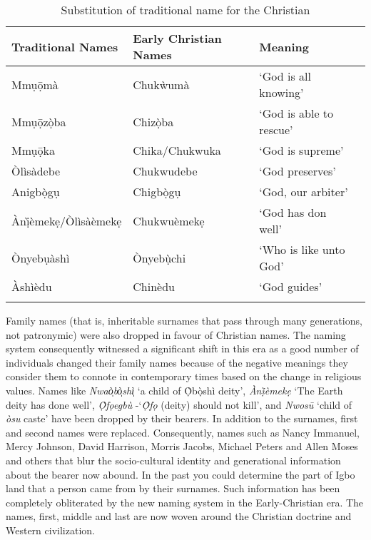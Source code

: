 \documentclass[output=paper]{langscibook}
\begin{document}
\begin{table}
\caption{\label{tab:owaleke:4.1}Substitution of traditional name for the Christian}
\begin{tabular}{llll}
\lsptoprule
{Traditional Names}             & {Early Christian Names} & {Meaning}                 &  \\ 
\midrule
{Mmụọ̄mà}                    & {Chukẁumà}            & {‘God is all knowing’}    &  \\ 
{Mmụọ̄zọ̀ba}                 & {Chizọ̀ba}             & {‘God is able to rescue’} &  \\ 
{Mmụọ̄ka}                     & {Chika/Chukwuka}        & {‘God is supreme’}        &  \\ 
{Òlìsàdebe}                  & {Chukwudebe}            & {‘God preserves’}         &  \\ 
{Anigbọ̀gụ}                   & {Chigbọ̀gụ}           & {‘God, our arbiter'}      &  \\ 
{Ànị̀èmekẹ/Òlìsàèmekẹ} & {Chukwuèmekẹ}         & {‘God has don well'}      &  \\
{Ònyebụàshì}                & {Ònyebụ̀chi}          & {‘Who is like unto God’}  &  \\ 
{Àshìèdu}                    & {Chinèdu}              & {‘God guides’}            &  \\
\lspbottomrule
\end{tabular}
\end{table}

Family names (that is, inheritable surnames that pass through many generations, not patronymic) were also dropped in favour of Christian names. The naming system consequently witnessed a significant shift in this era as a good number of individuals changed their family names because of the negative meanings they consider them to connote in contemporary times based on the change in religious values. Names like \textit{Nwaò̩bò̩shì̩} ‘a child of Ọ̀bọ̀shì deity’, \textit{Ànị̀èmekẹ}  ‘The Earth deity has done well’, \textit{Ọ̀fọegbù} -‘\textit{Ọ̀fọ} (deity) should not kill’, and \textit{Nwosū}  ‘child of \textit{òsu} caste’ have been dropped by their bearers. In addition to the surnames, first and second names were replaced. Consequently, names such as Nancy Immanuel, Mercy Johnson, David Harrison, Morris Jacobs, Michael Peters and Allen Moses and others that blur the socio-cultural identity and generational information about the bearer now abound. In the past you could determine the part of Igbo land that a person came from by their surnames. Such information has been completely obliterated by the new naming system in the Early-Christian era. The names, first, middle and last are now woven around the Christian doctrine and Western civilization.
\end{document}
